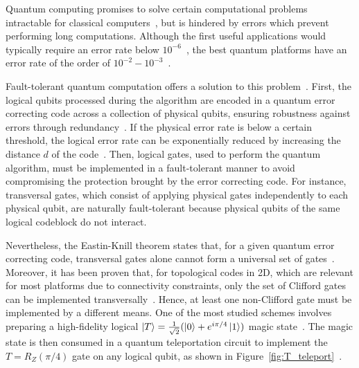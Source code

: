 \documentclass[%
 reprint,
superscriptaddress,
 amsmath,amssymb,
 aps,
]{revtex4-2}
\begin{document}
\maketitle

Quantum computing promises to solve certain computational problems intractable for classical computers~\cite{shor1994algorithms,dalzell2023quantum}, but is hindered by errors which prevent performing long computations. Although the first useful applications would typically require an error rate below $10^{-6}$~\cite{beverland2022assessing}, the best quantum platforms have an error rate of the order of $10^{-2}-10^{-3}$~\cite{acharya2024quantum,moses2023race,bluvstein2024logical}.

Fault-tolerant quantum computation offers a solution to this problem~\cite{shor1996fault}. First, the logical qubits processed during the algorithm are encoded in a quantum error correcting code across a collection of physical qubits, ensuring robustness against errors through redundancy~\cite{shor1995scheme,steane1996multiple}. If the physical error rate is below a certain threshold, the logical error rate can be exponentially reduced by increasing the distance $d$ of the code~\cite{aharonov1997fault,kitaev2003fault,knill1998resilient}. Then, logical gates, used to perform the quantum algorithm, must be implemented in a fault-tolerant manner to avoid compromising the protection brought by the error correcting code. For instance, transversal gates, which consist of applying physical gates independently to each physical qubit, are naturally fault-tolerant because physical qubits of the same logical codeblock do not interact.

Nevertheless, the Eastin-Knill theorem states that, for a given quantum error correcting code, transversal gates alone cannot form a universal set of gates~\cite{eastin2009restrictions}. Moreover, it has been proven that, for topological codes in 2D, which are relevant for most platforms due to connectivity constraints, only the set of Clifford gates can be implemented transversally~\cite{bravyi2013classification}. Hence, at least one non-Clifford gate must be implemented by a different means. One of the most studied schemes involves preparing a high-fidelity logical $\ket{T} = \tfrac{1}{\sqrt{2}}(\ket{0} + e^{i \pi/4} \ket{1})$ magic state~\cite{bravyi2005universal}. The magic state is then consumed in a quantum teleportation circuit to implement the $T = R_Z(\pi/4)$ gate on any logical qubit, as shown in Figure~\ref{fig:T_teleport}~\cite{zhou2000methodology}.
\end{document}
